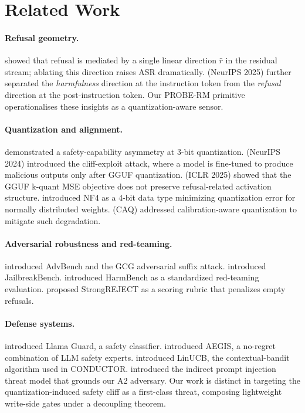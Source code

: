\documentclass[11pt,a4paper]{article}
\newcommand{\rhat}{\hat{r}}
\begin{document}
\section{Related Work}
\label{sec:related}

\paragraph{Refusal geometry.}
\citet{arditi2024refusal} showed that refusal is mediated by a single linear
direction $\rhat$ in the residual stream; ablating this direction raises ASR
dramatically.
\citet{zhao2025refusal} (NeurIPS 2025) further separated the \emph{harmfulness}
direction at the instruction token from the \emph{refusal} direction at the
post-instruction token.
Our PROBE-RM primitive operationalises these insights as a quantization-aware
sensor.

\paragraph{Quantization and alignment.}
\citet{hong2024quant} demonstrated a safety-capability asymmetry at 3-bit
quantization.
\citet{egashira2024exploiting} (NeurIPS 2024) introduced the cliff-exploit attack,
where a model is fine-tuned to produce malicious outputs only after GGUF
quantization.
\citet{mindthegap2025} (ICLR 2025) showed that the GGUF k-quant MSE objective
does not preserve refusal-related activation structure.
\citet{dettmers2023qlora} introduced NF4 as a 4-bit data type minimizing
quantization error for normally distributed weights.
\citet{wee2025caq} (CAQ) addressed calibration-aware quantization to mitigate
such degradation.

\paragraph{Adversarial robustness and red-teaming.}
\citet{zou2023advbench} introduced AdvBench and the GCG adversarial suffix
attack.
\citet{chao2024jailbreakbench} introduced JailbreakBench.
\citet{mazeika2024harmbench} introduced HarmBench as a standardized red-teaming
evaluation.
\citet{souly2024strongreject} proposed StrongREJECT as a scoring rubric that
penalizes empty refusals.

\paragraph{Defense systems.}
\citet{inan2023llama_guard} introduced Llama Guard, a safety classifier.
\citet{ghosh2024aegis} introduced AEGIS, a no-regret combination of LLM safety
experts.
\citet{li2010contextual} introduced LinUCB, the contextual-bandit algorithm used
in CONDUCTOR.
\citet{greshake2023not} introduced the indirect prompt injection threat model
that grounds our A2 adversary.
Our work is distinct in targeting the quantization-induced safety cliff as a
first-class threat, composing lightweight write-side gates under a decoupling
theorem.
\end{document}

